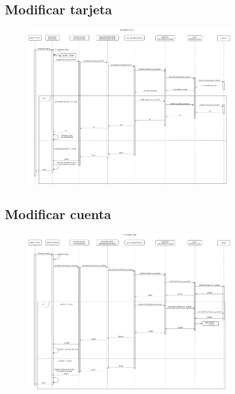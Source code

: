 \documentclass[12pt]{article}
\begin{document}
\subsection{Modificar tarjeta}
\begin{figure}[H]
    \centering
    \includegraphics[width=0.8\textwidth]{images/7-Gestor_modifica_tarjeta1.png}
\end{figure}
\subsection{Modificar cuenta}
\begin{figure}[H]
    \centering
    \includegraphics[width=0.8\textwidth]{images/8-Gestor_modifica_cuenta3.png}
\end{figure}
\end{document}
